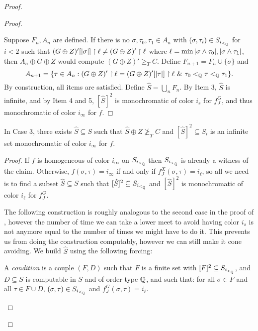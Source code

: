 \begin{proof}
\begin{proof}
\begin{enumerate}
    \end{enumerate}
Suppose $F_n,A_n$ are defined. If there is no $\sigma, \tau_0, \tau_1\in A_n$ with $(\sigma, \tau_i)\in S_{i_{<_{\mathbb{Q}}}}$ for $i<2$ such that $(G\oplus Z)'[|\sigma|]\upharpoonright \ell\neq (G\oplus Z)'\upharpoonright \ell$ where $\ell=\min|\sigma\wedge \tau_0|,|\sigma\wedge \tau_1|$, then $A_n\oplus G\oplus Z$ would compute $(G\oplus Z)'\geq_T C$. %
Define $F_{n+1}=F_n\cup\{\sigma\}$ and \[A_{n+1}=\{\tau\in A_n:(G\oplus Z)'\upharpoonright \ell=(G\oplus Z)'[|\tau|]\upharpoonright \ell\ \&\  \tau_0<_{\mathbb{Q}} \tau<_{\mathbb{Q}}\tau_1\}.\]
By construction, all items are satisfied. Define $\hat S=\bigcup_n F_n$. By Item 3, $\hat S$ is infinite, and by Item 4 and 5, $[\hat S]^2$ is monochromatic of color $i_s$ for $f_J^G$, and thus monochromatic of color $i_\infty$ for $f$.
  \end{proof}
  \begin{claim}
    In Case 3, there exists $\hat S\subseteq S$  such that $\hat S\oplus Z\not\geq_T C$ and $[\hat S]^2\subseteq S_i$ is an infinite set monochromatic of color $i_\infty$ for $f$.
  \end{claim}
  \begin{proof}
    If $f$ is homogeneous of color $i_\infty$ on $S_{i_{<_{\mathbb{Q}}}}$ then $S_{i_{<_{\mathbb{Q}}}}$ is already a witness of the claim. Otherwise, $f(\sigma,\tau)=i_\infty$ if and only if $f_J^X(\sigma, \tau)=i_\ell$, so all we need is to find a subset $\hat S\subseteq S$ such that $[\hat S]^2\subseteq S_{i_{<_{\mathbb{Q}}}}$ and $[\hat S]^2$ is monochromatic of color $i_\ell$ for $f_J^G$. %

         The following construction is roughly analogous to the second case in the proof of , however the number of time we can take a lower meet to avoid having color $i_s$ is not anymore equal to the number of times we might have to do it. This prevents us from doing the construction computably, however we can still make it cone avoiding. We build $\hat S$ using the following forcing:
    \begin{definition}
      A \emph{condition} is a couple $(F,D)$ such that $F$ is a finite set with $[F]^2\subseteq S_{{i_{<_{\mathbb{Q}}}}}$, and $D\subseteq S$ is computable in $S$ and of order-type $\mathbb{Q}$, and such that: for all $\sigma\in F$ and all $\tau\in F\cup D$, $(\sigma,\tau)\in S_{i_{<_{\mathbb{Q}}}}$ and $f_J^G(\sigma,\tau)=i_\ell$.


\end{definition}
\end{proof}
\end{proof}
